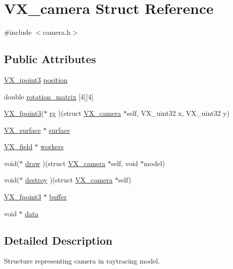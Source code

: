 \hypertarget{structVX__camera}{\section{V\-X\-\_\-camera Struct Reference}
\label{structVX__camera}
}


{\ttfamily \#include $<$camera.\-h$>$}

\subsection*{Public Attributes}
\begin{DoxyCompactItemize}
\item 
\hyperlink{structVX__ipoint3}{V\-X\-\_\-ipoint3} \hyperlink{structVX__camera_a60724e5c89d5b3f4b860feef5bd48dd5}{position}
\item 
double \hyperlink{structVX__camera_ad367620c428520c36d2a53f4c2db458b}{rotation\-\_\-matrix} \mbox{[}4\mbox{]}\mbox{[}4\mbox{]}
\item 
\hyperlink{structVX__fpoint3}{V\-X\-\_\-fpoint3}($\ast$ \hyperlink{structVX__camera_a6119ed12afba4631610196a7989fb7cf}{rg} )(struct \hyperlink{structVX__camera}{V\-X\-\_\-camera} $\ast$self, V\-X\-\_\-uint32 x, V\-X\-\_\-uint32 y)
\item 
\hyperlink{structVX__surface}{V\-X\-\_\-surface} $\ast$ \hyperlink{structVX__camera_add16fec4e751e381a855f9ab311a7873}{surface}
\item 
\hyperlink{structVX__field}{V\-X\-\_\-field} $\ast$ \hyperlink{structVX__camera_a6162d4618d183193b6da7a3d7bfa573b}{workers}
\item 
void($\ast$ \hyperlink{structVX__camera_ac0a8d4af706ab244df474fa60776d30b}{draw} )(struct \hyperlink{structVX__camera}{V\-X\-\_\-camera} $\ast$self, void $\ast$model)
\item 
void($\ast$ \hyperlink{structVX__camera_a507391328f61922afd6369562947e7a8}{destroy} )(struct \hyperlink{structVX__camera}{V\-X\-\_\-camera} $\ast$self)
\item 
\hyperlink{structVX__fpoint3}{V\-X\-\_\-fpoint3} $\ast$ \hyperlink{structVX__camera_ab99ed3683f52574a5a6dfadac12eb3ea}{buffer}
\item 
void $\ast$ \hyperlink{structVX__camera_af16b6d657c8c9f9c27764c5c6d923855}{data}
\end{DoxyCompactItemize}


\subsection{Detailed Description}
Structure representing camera in raytracing model. 

